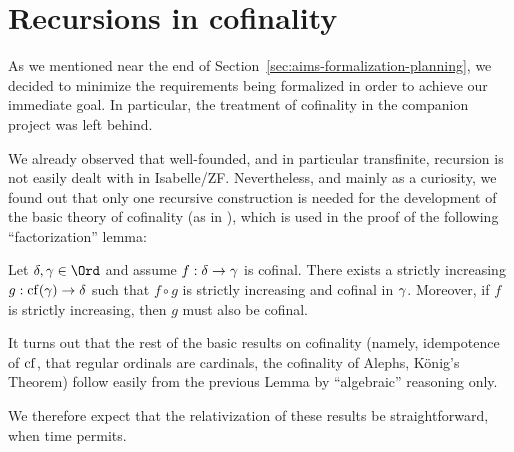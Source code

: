 \section{Recursions in cofinality}\label{sec:recursions-cofinality}

As we mentioned near the end of
Section~\ref{sec:aims-formalization-planning}, we decided to minimize
the requirements being formalized in order to achieve our immediate
goal. In particular, the treatment of cofinality in the companion
project \cite{Delta_System_Lemma-AFP} was left behind.

We already observed that well-founded, and in particular transfinite,
recursion is not easily dealt with in Isabelle/ZF. Nevertheless, and
mainly as a curiosity, we found out that only one recursive
construction is needed for the development of the basic theory of
cofinality (as in \cite[Sect.~I.13]{kunen2011set}), which is used in
the proof of the following “factorization” lemma:

\begin{lemma}
  Let $\del,\ga\in\Ord$ and assume $f:\delta\to\gamma$ is cofinal.  There exists
  a strictly increasing $g:\operatorname{cf}(\gamma)\to \delta$ such that $f\circ g$ is
  strictly increasing and cofinal in $\gamma$. Moreover, if $f$ is
  strictly increasing, then $g$ must also be cofinal.
\end{lemma}

It turns out that the rest of the basic results on cofinality (namely,
idempotence of $\operatorname{cf}$, that regular ordinals are cardinals, the
cofinality of Alephs, König's Theorem) follow easily from the previous
Lemma by “algebraic” reasoning only.

We therefore expect that the relativization of these
results be straightforward, when time permits.


